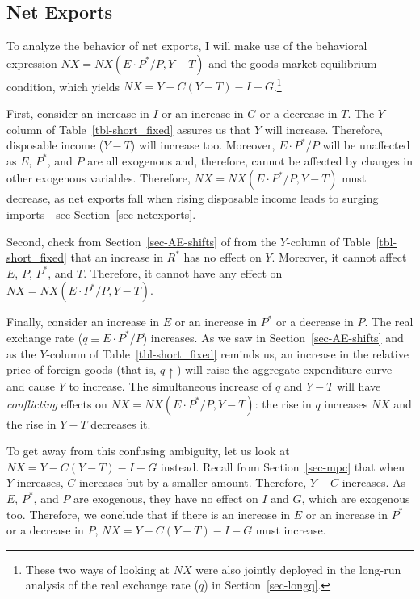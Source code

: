 \documentclass[
  letterpaper,
]{book}
\theoremstyle{plain}
\theoremstyle{remark}
\begin{document}
\subsection{Net Exports}\label{sec-nx-shortfix}

To analyze the behavior of net exports, I will make use of the
behavioral expression \(NX=NX(E\cdot P^*/P,Y-T)\) and the goods market
equilibrium condition, which yields \(NX=Y-C(Y-T)-I-G\).\footnote{These
  two ways of looking at \(NX\) were also jointly deployed in the
  long-run analysis of the real exchange rate (\(q\)) in
  Section~\ref{sec-longq}.}

First, consider an increase in \(I\) or an increase in \(G\) or a
decrease in \(T\). The \(Y\)-column of Table~\ref{tbl-short_fixed}
assures us that \(Y\) will increase. Therefore, disposable income
(\(Y-T\)) will increase too. Moreover, \(E\cdot P^*/P\) will be
unaffected as \(E\), \(P^*\), and \(P\) are all exogenous and,
therefore, cannot be affected by changes in other exogenous variables.
Therefore, \(NX=NX(E\cdot P^*/P,Y-T)\) must decrease, as net exports
fall when rising disposable income leads to surging imports---see
Section~\ref{sec-netexports}.

Second, check from Section~\ref{sec-AE-shifts} of from the \(Y\)-column
of Table~\ref{tbl-short_fixed} that an increase in \(R^*\) has no effect
on \(Y\). Moreover, it cannot affect \(E\), \(P\), \(P^*\), and \(T\).
Therefore, it cannot have any effect on \(NX=NX(E\cdot P^*/P,Y-T)\).

Finally, consider an increase in \(E\) or an increase in \(P^*\) or a
decrease in \(P\). The real exchange rate (\(q\equiv E\cdot P^*/P\))
increases. As we saw in Section~\ref{sec-AE-shifts} and as the
\(Y\)-column of Table~\ref{tbl-short_fixed} reminds us, an increase in
the relative price of foreign goods (that is, \(q\uparrow\)) will raise
the aggregate expenditure curve and cause \(Y\) to increase. The
simultaneous increase of \(q\) and \(Y-T\) will have \emph{conflicting}
effects on \(NX=NX(E\cdot P^*/P,Y-T)\): the rise in \(q\) increases
\(NX\) and the rise in \(Y-T\) decreases it.

To get away from this confusing ambiguity, let us look at
\(NX=Y-C(Y-T)-I-G\) instead. Recall from Section~\ref{sec-mpc} that when
\(Y\) increases, \(C\) increases but by a smaller amount. Therefore,
\(Y-C\) increases. As \(E\), \(P^*\), and \(P\) are exogenous, they have
no effect on \(I\) and \(G\), which are exogenous too. Therefore, we
conclude that if there is an increase in \(E\) or an increase in \(P^*\)
or a decrease in \(P\), \(NX=Y-C(Y-T)-I-G\) must increase.
\end{document}
